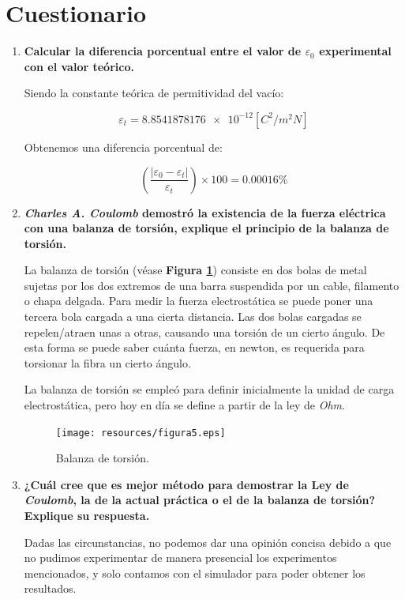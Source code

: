\documentclass[letter,11pt]{article}
\begin{document}
\section{Cuestionario}

\begin{enumerate}
\item \textbf{Calcular la diferencia porcentual entre el valor de
$\varepsilon_0$ experimental con el valor teórico.}

Siendo la constante teórica de permitividad del vacío:

\begin{equation*}
    \varepsilon_t = \num{8.8541878176e-12} [C^2/m^2 N]
\end{equation*}

Obtenemos una diferencia porcentual de:

\begin{equation}
    \left(\frac{|\varepsilon_0 - \varepsilon_t|}{\varepsilon_t}\right) \times 100 = 0.00016 \%
\end{equation}

\item \textbf{\emph{Charles A. Coulomb} demostró la existencia de la fuerza
eléctrica con una balanza de torsión, explique el principio de la balanza de
torsión.}

La balanza de torsión (véase \textbf{Figura \ref{figura5}}) consiste en dos
bolas de metal sujetas por los dos extremos de una barra suspendida por un
cable, filamento o chapa delgada. Para medir la fuerza electrostática se puede
poner una tercera bola cargada a una cierta distancia. Las dos bolas cargadas se
repelen/atraen unas a otras, causando una torsión de un cierto ángulo. De esta
forma se puede saber cuánta fuerza, en newton, es requerida para torsionar la
fibra un cierto ángulo.

La balanza de torsión se empleó para definir inicialmente la unidad de carga
electrostática, pero hoy en día se define a partir de la ley de \emph{Ohm}.

\begin{figure}[!h]
\centering
\texttt{[image: resources/figura5.eps]}
\caption{Balanza de torsión.}
\label{figura5}
\end{figure}

\item \textbf{¿Cuál cree que es mejor método para demostrar la Ley de
\emph{Coulomb}, la de la actual práctica o el de la balanza de torsión?
Explique su respuesta.}

Dadas las circunstancias, no podemos dar una opinión concisa debido a que no
pudimos experimentar de manera presencial los experimentos mencionados, y solo
contamos con el simulador para poder obtener los resultados.
\end{enumerate}
\end{document}
